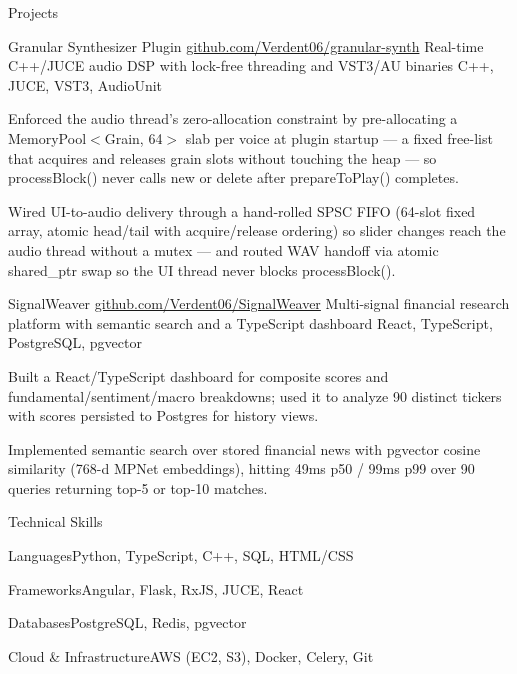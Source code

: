 \documentclass[
	11pt
]{../../../template}
\begin{document}
	\begin{rSection}{P}{rojects}
		\begin{rSectionEntry}
			{Granular Synthesizer Plugin}
			{\href{https://github.com/Verdent06/granular-synth}{github.com/Verdent06/granular-synth}}
			{Real-time C++/JUCE audio DSP with lock-free threading and VST3/AU binaries}
			{C++, JUCE, VST3, AudioUnit}
			{}

			\item Enforced the audio thread's zero-allocation constraint by pre-allocating a MemoryPool$<$Grain, 64$>$ slab per voice at plugin startup --- a fixed free-list that acquires and releases grain slots without touching the heap --- so processBlock() never calls new or delete after prepareToPlay() completes.
			\item Wired UI-to-audio delivery through a hand-rolled SPSC FIFO (64-slot fixed array, atomic head/tail with acquire/release ordering) so slider changes reach the audio thread without a mutex --- and routed WAV handoff via atomic shared\_ptr swap so the UI thread never blocks processBlock().
		\end{rSectionEntry}

		\begin{rSectionEntry}
			{SignalWeaver}
			{\href{https://github.com/Verdent06/SignalWeaver}{github.com/Verdent06/SignalWeaver}}
			{Multi-signal financial research platform with semantic search and a TypeScript dashboard}
			{React, TypeScript, PostgreSQL, pgvector}
			{}

			\item Built a React/TypeScript dashboard for composite scores and fundamental/sentiment/macro breakdowns; used it to analyze 90 distinct tickers with scores persisted to Postgres for history views.
			\item Implemented semantic search over stored financial news with pgvector cosine similarity (768-d MPNet embeddings), hitting 49ms p50 / 99ms p99 over 90 queries returning top-5 or top-10 matches.
		\end{rSectionEntry}
	\end{rSection}

	\begin{rSection}{T}{echnical Skills}
		\begin{rSet}{Languages}{Python, TypeScript, C++, SQL, HTML/CSS}
		\end{rSet}
		\begin{rSet}{Frameworks}{Angular, Flask, RxJS, JUCE, React}
		\end{rSet}
		\begin{rSet}{Databases}{PostgreSQL, Redis, pgvector}
		\end{rSet}
		\begin{rSet}{Cloud \& Infrastructure}{AWS (EC2, S3), Docker, Celery, Git}
		\end{rSet}
	\end{rSection}
\end{document}

